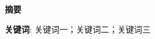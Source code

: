 \begin{center}
    \sanhao \bfseries
    \fangsong
    摘要
\end{center}

\zhlipsum[20]

\noindent \textbf{关键词}: 关键词一；关键词二；关键词三
